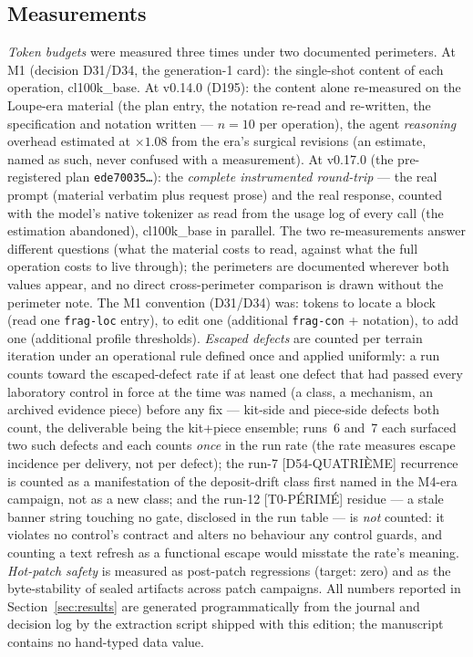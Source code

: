 \documentclass[10pt,a4paper]{article}
\newcommand{\code}[1]{\texttt{\small #1}}
\begin{document}
\subsection{Measurements}\label{sec:mesures}

\emph{Token budgets} were measured three times under two documented
perimeters. At M1 (decision D31/D34, the generation-1 card): the
single-shot content of each operation, cl100k\_base. At v0.14.0 (D195):
the content alone re-measured on the Loupe-era material (the plan entry,
the notation re-read and re-written, the specification and notation
written --- $n{=}10$ per operation), the agent \emph{reasoning} overhead
estimated at $\times 1.08$ from the era's surgical revisions (an
estimate, named as such, never confused with a measurement). At v0.17.0
(the pre-registered plan \code{ede70035\ldots}): the \emph{complete
instrumented round-trip} --- the real prompt (material verbatim plus
request prose) and the real response, counted with the model's native
tokenizer as read from the usage log of every call (the estimation
abandoned), cl100k\_base in parallel. The two re-measurements answer
different questions (what the material costs to read, against what the
full operation costs to live through); the perimeters are documented
wherever both values appear, and no direct cross-perimeter comparison
is drawn without the perimeter note. The M1 convention (D31/D34) was:
tokens to locate a block (read one \code{frag-loc} entry), to edit one
(additional \code{frag-con} + notation), to add one (additional
profile thresholds). \emph{Escaped defects} are counted per terrain
iteration under an operational rule defined once and applied uniformly:
a run counts toward the escaped-defect rate if at least one defect that
had passed every laboratory control in force at the time was named (a
class, a mechanism, an archived evidence piece) before any fix ---
kit-side and piece-side defects both count, the deliverable being the
kit+piece ensemble; runs~6 and~7 each surfaced two such defects and each
counts \emph{once} in the run rate (the rate measures escape incidence
per delivery, not per defect); the run-7 [D54-QUATRI\`EME] recurrence
is counted as a manifestation of the deposit-drift class first named in
the M4-era campaign, not as a new class; and the run-12 [T0-P\'ERIM\'E]
residue --- a stale banner string touching no gate, disclosed in the run
table --- is \emph{not} counted: it violates no control's contract and
alters no behaviour any control guards, and counting a text refresh as a
functional escape would misstate the rate's meaning.
\emph{Hot-patch safety} is measured as post-patch regressions (target:
zero) and as the byte-stability of sealed artifacts across patch
campaigns. All numbers reported in Section~\ref{sec:results} are
generated programmatically from the journal and decision log by the
extraction script shipped with this edition; the manuscript contains no
hand-typed data value.
\end{document}
